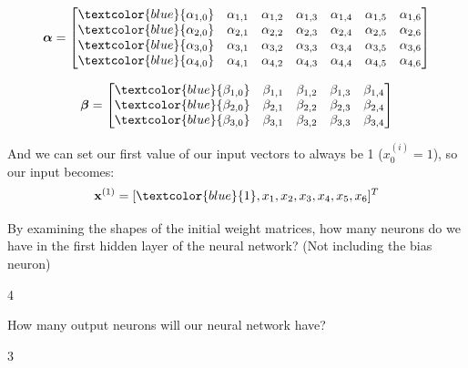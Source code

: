 \documentclass[11pt]{exam}
\numberwithin{equation}{section} %
\numberwithin{figure}{section} %
\numberwithin{table}{section} %
\newcommand{\xv}{\mathbf{x}}
\begin{document}
\begin{enumerate}
	$$\boldsymbol{\alpha}=
	    \begin{bmatrix}
	    \textcolor{blue}{\alpha_{1,0}} & \alpha_{1,1} & \alpha_{1,2} & \alpha_{1,3} & \alpha_{1,4} & \alpha_{1,5} & \alpha_{1,6} \\
	    \textcolor{blue}{\alpha_{2,0}} & \alpha_{2,1} & \alpha_{2,2} & \alpha_{2,3} & \alpha_{2,4} & \alpha_{2,5} & \alpha_{2,6} \\
	    \textcolor{blue}{\alpha_{3,0}} & \alpha_{3,1} & \alpha_{3,2} & \alpha_{3,3} & \alpha_{3,4} & \alpha_{3,5} & \alpha_{3,6} \\
	    \textcolor{blue}{\alpha_{4,0}} & \alpha_{4,1} & \alpha_{4,2} & \alpha_{4,3} & \alpha_{4,4} & \alpha_{4,5} & \alpha_{4,6}
	    \end{bmatrix}$$
	    
	$$\boldsymbol{\beta}=
	    \begin{bmatrix}
	    \textcolor{blue}{\beta_{1,0}} & \beta_{1,1} & \beta_{1,2} & \beta_{1,3} & \beta_{1,4} \\
	    \textcolor{blue}{\beta_{2,0}} & \beta_{2,1} & \beta_{2,2} & \beta_{2,3} & \beta_{2,4} \\
	    \textcolor{blue}{\beta_{3,0}} & \beta_{3,1} & \beta_{3,2} & \beta_{3,3} & \beta_{3,4}
	    \end{bmatrix}$$
	
	    And we can set our first value of our input vectors to always be 1 ($x_0^{(i)} = 1$), so our input becomes: $$\xv^{(1)}=[\textcolor{blue}{1},x_1,x_2,x_3,x_4,x_5,x_6]^T$$
	    
	    
	    \begin{questions}
	        \question[1] By examining the shapes of the initial weight matrices, how many neurons do we have in the first hidden layer of the neural network? (Not including the bias neuron)
	        
	        \begin{tcolorbox}[fit,height=1cm, width=2cm, blank, borderline={1pt}{-2pt}]
			4
	        \end{tcolorbox}
	        
	        
	        
	        
	        \question[1] How many output neurons will our neural network have?
	        
	        \begin{tcolorbox}[fit,height=1cm, width=2cm, blank, borderline={1pt}{-2pt}]
			3
	        \end{tcolorbox}
	        

\end{questions}
\end{enumerate}
\end{document}
